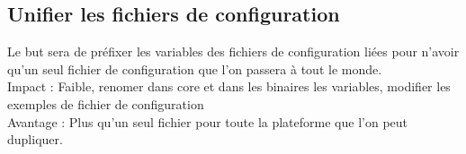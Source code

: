 \documentclass{article}
\begin{document}
\subsection{Unifier les fichiers de configuration}
Le but sera de préfixer les variables des fichiers de configuration liées pour n'avoir
qu'un seul fichier de configuration que l'on passera à tout le monde.\\
Impact : Faible, renomer dans core et dans les binaires les variables, 
modifier les exemples de fichier de configuration \\
Avantage : Plus qu'un seul fichier pour toute la plateforme que l'on peut dupliquer.

\clearpage
%
%
    
\end{document}
